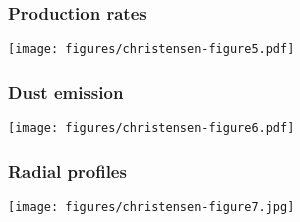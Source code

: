 \documentclass{beamer}
\begin{document}
\begin{frame}
\frametitle{Production rates}
\texttt{[image: figures/christensen-figure5.pdf]}
\end{frame}

\begin{frame}
\frametitle{Dust emission}
\texttt{[image: figures/christensen-figure6.pdf]}
\end{frame}

\begin{frame}
\frametitle{Radial profiles}
\texttt{[image: figures/christensen-figure7.jpg]}
\end{frame}
\end{document}
